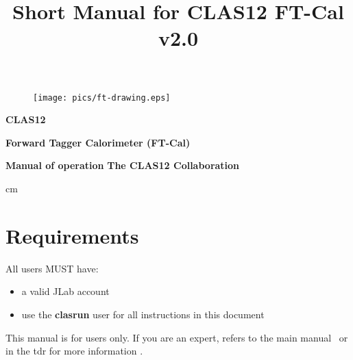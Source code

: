 \documentclass[11.5pt]{article}
\begin{document}
\vskip 0.5cm
\begin{center}

\begin{figure}[htbp]
\begin{center}
\vspace{0cm}
\texttt{[image: pics/ft-drawing.eps]}
\end{center}
\end{figure}

\vskip 1.5cm

{\huge\bf\bf CLAS12}
\vskip 0.5cm

{\huge\bf\bf Forward Tagger Calorimeter (FT-Cal)}
\vskip 0.5cm


{\huge\bf Manual of operation}
\vskip 0.8cm
{\large\bf The CLAS12 Collaboration}
\vskip 0.5cm
\end{center}

 cm
\vskip 0.5cm

\newpage

\title{Short Manual for CLAS12 FT-Cal v2.0} 

\maketitle{}

\tableofcontents

\newpage


\section{Requirements}
All users MUST have:\\
\begin{itemize}
\item   a valid JLab account 
\item   use the \textbf{clasrun} user for all instructions in this document
\end{itemize}
This manual is for users only. If you are an expert, refers to the main manual~\cite{manual} or in the tdr for more information \cite{ftacl-tdr}.
\end{document}
